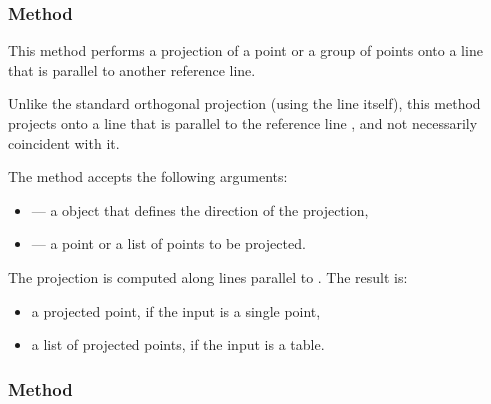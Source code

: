 \subsubsection{Method }
\label{ssub:method_line_projection__ll}

This method performs a projection of a point or a group of points onto a line that is parallel to another reference line.

\medskip
\noindent
Unlike the standard orthogonal projection (using the line itself), this method projects onto a line that is parallel to the reference line , and not necessarily coincident with it.

\medskip
\noindent
The method accepts the following arguments:
\begin{itemize}
  \item {} — a  object that defines the direction of the projection,
  \item {} — a point or a list of points to be projected.
\end{itemize}

\noindent
The projection is computed along lines parallel to . The result is:
\begin{itemize}
  \item a projected point, if the input is a single point,
  \item a list of projected points, if the input is a table.
\end{itemize}

\vspace{1em}

\begin{tkzexample}[latex=.5\textwidth]
\begin{center}
\end{center}

\end{tkzexample}

\subsubsection{Method }
\label{ssub:method_line_affinity}

